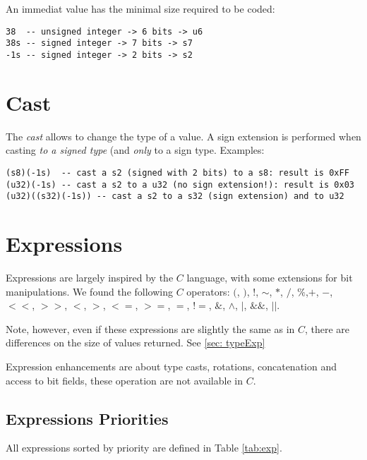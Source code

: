 An immediat value has the minimal size required to be coded:
\begin{lstlisting}
38  -- unsigned integer -> 6 bits -> u6
38s -- signed integer -> 7 bits -> s7
-1s -- signed integer -> 2 bits -> s2
\end{lstlisting}

\section{Cast}

The \emph{cast} allows to change the type of a value. A sign extension is performed when casting \emph{to a signed type} (and \emph{only} to a sign type. Examples:
\begin{lstlisting}
(s8)(-1s)  -- cast a s2 (signed with 2 bits) to a s8: result is 0xFF
(u32)(-1s) -- cast a s2 to a u32 (no sign extension!): result is 0x03
(u32)((s32)(-1s)) -- cast a s2 to a s32 (sign extension) and to u32
\end{lstlisting}


\section{Expressions}
\label{sec:expressions}
Expressions are largely inspired by the $C$ language, with some extensions for bit manipulations. We found the following $C$ operators: $($, $)$, $!$, $\sim$, $*$, $/$, $\%$,$+$, $-$, $<<$, $>>$, $<$, $>$, $<=$, $>=$, $=$, $!=$, $\&$, $\wedge$, $|$, $\&\&$, $||$.

Note, however, even if these expressions are slightly the same as in $C$, there are differences on the size of values returned. See \ref{sec: typeExp}

Expression enhancements are about type casts, rotations, concatenation and access to bit fields, these operation are not available in $C$.

\subsection{Expressions Priorities}
All expressions sorted by priority are defined in Table \ref{tab:exp}.

